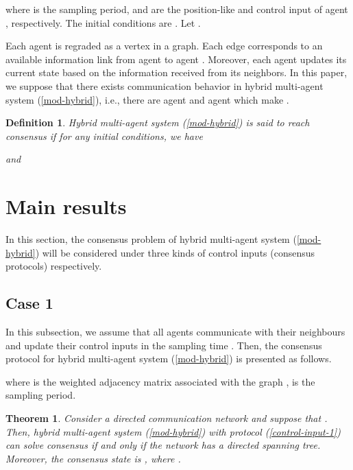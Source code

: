 \documentclass[12pt,draftcls,onecolumn]{IEEEtran}
\newtheorem{theorem}{Theorem}
\newtheorem{definition}{Definition}
\begin{document}
where  is the sampling period,  and  are the position-like and control input of agent , respectively. The initial conditions are .  Let .

Each agent is regraded as a vertex in a graph. Each edge  corresponds to an available information link from agent  to agent . Moreover, each agent updates its current state based on the information received from its neighbors. In this paper, we suppose that there exists communication behavior in hybrid multi-agent system (\ref{mod-hybrid}), i.e.,  there are agent  and agent  which make .

\begin{definition}\label{def-consensus} Hybrid multi-agent system (\ref{mod-hybrid}) is said to reach consensus if for any initial conditions, we have

and

\end{definition}



\section{Main results}\label{s-Main results}

In this section, the consensus problem of hybrid multi-agent system (\ref{mod-hybrid}) will be considered under three kinds of control inputs (consensus protocols) respectively.





\subsection{Case 1}\label{s-case1}
In this subsection, we assume that all agents communicate with their neighbours and update their control inputs in the sampling time . Then, the consensus protocol for hybrid multi-agent system (\ref{mod-hybrid}) is presented as follows.

where  is the weighted adjacency matrix
associated with the graph ,  is the sampling period.

\begin{theorem}\label{consensus-case1}
Consider a directed communication network  and suppose that . Then, hybrid multi-agent system (\ref{mod-hybrid}) with protocol (\ref{control-input-1}) can solve consensus if and only if the network  has a directed spanning tree. Moreover, the consensus state is , where .  \end{theorem}
\end{document}
